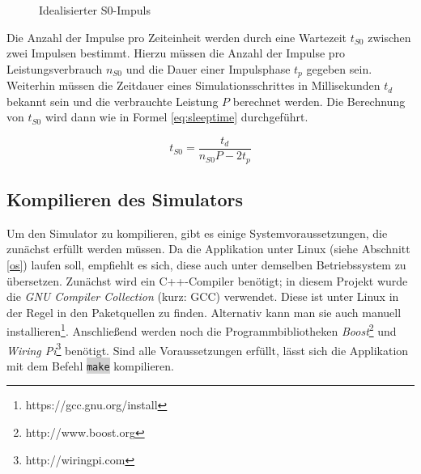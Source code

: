 \begin{figure}[h]
\begin{center}
\label{fig:s0impuls}
\caption{Idealisierter S0-Impuls}
\end{center}
\end{figure}

Die Anzahl der Impulse pro Zeiteinheit werden durch eine Wartezeit $ t_{S0} $ zwischen zwei Impulsen bestimmt. Hierzu müssen die Anzahl der Impulse pro Leistungsverbrauch $ n_{S0} $ und die Dauer einer Impulsphase $ t_p $ gegeben sein. Weiterhin müssen die Zeitdauer eines Simulationsschrittes in Millisekunden $ t_d $ bekannt sein und die verbrauchte Leistung $ P $ berechnet werden. Die Berechnung von $ t_{S0} $ wird dann wie in Formel \ref{eq:sleeptime} durchgeführt.

\begin{equation}\label{eq:sleeptime}
t_{S0} = \frac{t_d}{n_{S0} P - 2 t_p}
\end{equation}

\subsection{Kompilieren des Simulators}\label{simulatorcompile}
Um den Simulator zu kompilieren, gibt es einige Systemvoraussetzungen, die zunächst erfüllt werden müssen. Da die Applikation unter Linux (siehe Abschnitt \ref{os}) laufen soll, empfiehlt es sich, diese auch unter demselben Betriebssystem zu übersetzen. Zunächst wird ein C++-Compiler benötigt; in diesem Projekt wurde die \emph{GNU Compiler Collection} (kurz: GCC) verwendet. Diese ist unter Linux in der Regel in den Paketquellen zu finden. Alternativ kann man sie auch manuell installieren\footnote{https://gcc.gnu.org/install}. Anschließend werden noch die Programmbibliotheken \emph{Boost}\footnote{http://www.boost.org} und \emph{Wiring Pi}\footnote{http://wiringpi.com} benötigt.
Sind alle Voraussetzungen erfüllt, lässt sich die Applikation mit dem Befehl \colorbox{lightgrey}{\lstinline[basicstyle=\ttfamily]|make|} kompilieren.

